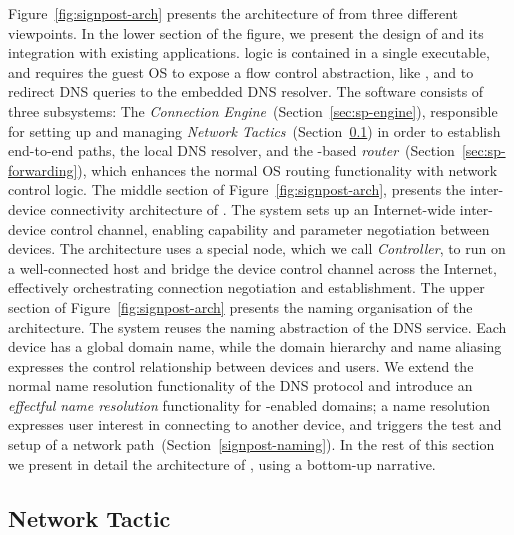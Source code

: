 Figure~\ref{fig:signpost-arch} presents the architecture of \signpost from three
different viewpoints.  In the lower section of the figure, we present the design
of \signpost and its integration with existing applications.
\signpost logic is contained in a single executable, and requires the guest
OS to expose a flow control abstraction, like \of, and to redirect
DNS queries to the embedded DNS resolver.  The software consists of three
subsystems: The \textit{Connection Engine}~(Section~\ref{sec:sp-engine}),
responsible for setting up and managing \textit{Network
  Tactics}~(Section~\ref{sec:sp-tactics}) in order to establish end-to-end paths,
the local DNS resolver, and the \of-based \textit{\signpost
  router}~(Section~\ref{sec:sp-forwarding}), which enhances the normal OS routing
functionality with \signpost network control logic.
The middle section of Figure~\ref{fig:signpost-arch}, presents the inter-device
connectivity architecture of \signpost. The system sets up an Internet-wide
inter-device control channel, enabling capability and parameter negotiation
between devices. The architecture  uses a special \signpost node, which we call
\emph{\signpost Controller}, to run on a well-connected host and bridge the
device control channel across the Internet, effectively orchestrating connection
negotiation and establishment.
%
The upper section of Figure~\ref{fig:signpost-arch} presents the naming
organisation of the \signpost architecture. The system reuses the naming
abstraction of the DNS service. Each device has a global domain name, while the
domain hierarchy and name aliasing expresses the control relationship between
devices and users.  We extend the normal name resolution functionality of the
DNS protocol and introduce an \textit{effectful name resolution} functionality
for \signpost-enabled domains; a name resolution expresses user interest in
connecting to another device, and triggers the test and setup of a network
path~(Section~\ref{signpost-naming}).  In the rest of this section we present in
detail the architecture of \signpost, using a bottom-up narrative.

\subsection{Network Tactic} \label{sec:sp-tactics}

